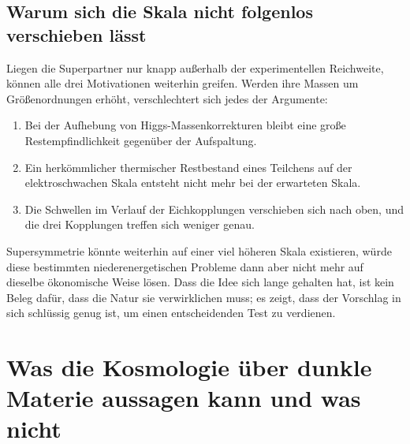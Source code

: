 \subsection{Warum sich die Skala nicht folgenlos verschieben lässt}

Liegen die Superpartner nur knapp außerhalb der experimentellen Reichweite, können alle drei Motivationen weiterhin greifen. Werden ihre Massen um Größenordnungen erhöht, verschlechtert sich jedes der Argumente:
\begin{enumerate}
\item Bei der Aufhebung von Higgs-Massenkorrekturen bleibt eine große Restempfindlichkeit gegenüber der Aufspaltung.
\item Ein herkömmlicher thermischer Restbestand eines Teilchens auf der elektroschwachen Skala entsteht nicht mehr bei der erwarteten Skala.
\item Die Schwellen im Verlauf der Eichkopplungen verschieben sich nach oben, und die drei Kopplungen treffen sich weniger genau.
\end{enumerate}
Supersymmetrie könnte weiterhin auf einer viel höheren Skala existieren, würde diese bestimmten niederenergetischen Probleme dann aber nicht mehr auf dieselbe ökonomische Weise lösen. Dass die Idee sich lange gehalten hat, ist kein Beleg dafür, dass die Natur sie verwirklichen muss; es zeigt, dass der Vorschlag in sich schlüssig genug ist, um einen entscheidenden Test zu verdienen.

\section{Was die Kosmologie über dunkle Materie aussagen kann und was nicht}

\begin{classroomqa}
\end{classroomqa}

